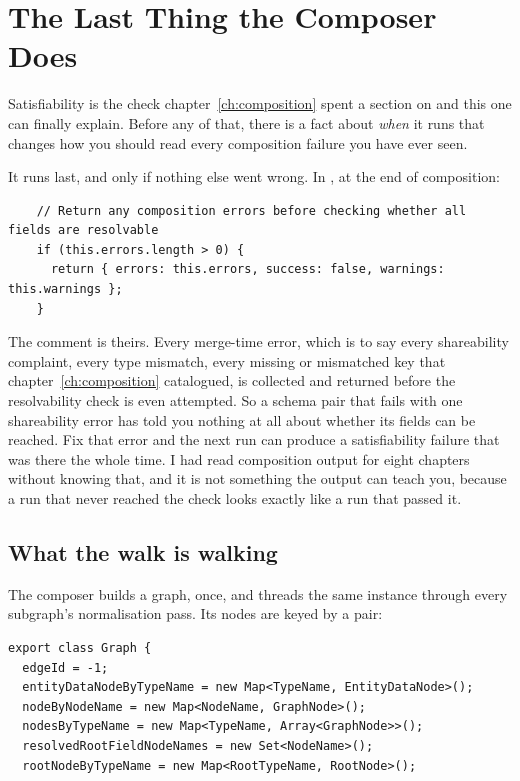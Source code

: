 \section{The Last Thing the Composer Does}
\label{sec:ch17-the-last-thing-the-composer-does}
%

Satisfiability is the check chapter~\ref{ch:composition} spent a section on and
this one can finally explain. Before any of that, there is a fact about
\emph{when} it runs that changes how you should read every composition failure
you have ever seen.

%
It runs last, and only if nothing else went wrong. In
, at the end of composition:

\begin{verbatim}
    // Return any composition errors before checking whether all fields are resolvable
    if (this.errors.length > 0) {
      return { errors: this.errors, success: false, warnings: this.warnings };
    }
\end{verbatim}

The comment is theirs. Every merge-time error, which is to say every
shareability complaint, every type mismatch, every missing or mismatched key
that chapter~\ref{ch:composition} catalogued, is collected and returned before
the resolvability check is even attempted. So a schema pair that fails with one
shareability error has told you nothing at all about whether its fields can be
reached. Fix that error and the next run can produce a satisfiability failure
that was there the whole time. I had read composition output for eight chapters
without knowing that, and it is not something the output can teach you, because
a run that never reached the check looks exactly like a run that passed it.

\subsection*{What the walk is walking}

%
The composer builds a graph, once, and threads the same instance through every
subgraph's normalisation pass. Its nodes are keyed by a pair:

\begin{verbatim}
export class Graph {
  edgeId = -1;
  entityDataNodeByTypeName = new Map<TypeName, EntityDataNode>();
  nodeByNodeName = new Map<NodeName, GraphNode>();
  nodesByTypeName = new Map<TypeName, Array<GraphNode>>();
  resolvedRootFieldNodeNames = new Set<NodeName>();
  rootNodeByTypeName = new Map<RootTypeName, RootNode>();
\end{verbatim}

